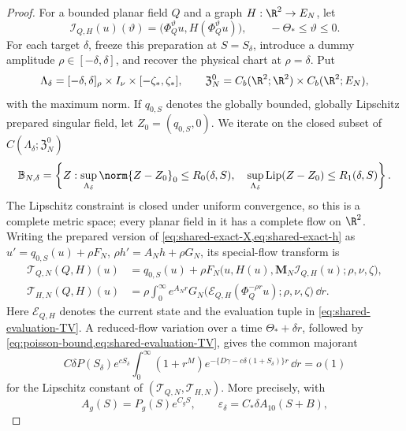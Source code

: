 \begin{proof}
For a bounded planar field \(Q\) and a graph \(H:\R^2\to E_N\), let
\[
 \mathcal I_{Q,H}(u)(\vartheta)
 =\bigl(\Phi_Q^\vartheta u,H(\Phi_Q^\vartheta u)\bigr),
 \qquad -\Theta_*\le\vartheta\le0.
\]
For each target \(\delta\), freeze this preparation at
\(S=S_\delta\), introduce a dummy amplitude
\(\rho\in[-\delta,\delta]\), and recover the physical chart at
\(\rho=\delta\).  Put
\[
 \Lambda_\delta=[-\delta,\delta]_\rho\times I_\nu
                  \times[-\zeta_*,\zeta_*],
 \qquad
 \mathfrak Z_N^0=C_b(\R^2;\R^2)\times C_b(\R^2;E_N),
\]
with the maximum norm.  If \(q_{0,S}\) denotes the globally bounded,
globally Lipschitz prepared singular field, let \(Z_0=(q_{0,S},0)\).  We
iterate on the closed subset of
\(C(\Lambda_\delta;\mathfrak Z_N^0)\)
\begin{equation}
 \mathbb B_{N,\delta}
 =\left\{Z:
 \sup_{\Lambda_\delta}\norm{Z-Z_0}_0\le R_0(\delta,S),\quad
 \sup_{\Lambda_\delta}\operatorname{Lip}(Z-Z_0)\le R_1(\delta,S)
 \right\}.                                            \label{eq:shared-graph-ball}
\end{equation}
The Lipschitz constraint is closed under uniform convergence, so this is a
complete metric space; every planar field in it has a complete flow on
\(\R^2\).  Writing the prepared version of
\cref{eq:shared-exact-X,eq:shared-exact-h} as
\(u'=q_{0,S}(u)+\rho F_N\),
\(\rho h'=A_Nh+\rho G_N\), its special-flow transform is
\begin{align}
 \mathcal T_{Q,N}(Q,H)(u)
 &=q_{0,S}(u)+\rho F_N
   \bigl(u,H(u),\mathbf M_N\mathcal I_{Q,H}(u);\rho,\nu,\zeta\bigr),
                                                               \label{eq:shared-TQ}\\
 \mathcal T_{H,N}(Q,H)(u)
 &=\rho\int_0^\infty e^{A_Nr}G_N
   \bigl(\mathcal E_{Q,H}(\Phi_Q^{-\rho r}u);
               \rho,\nu,\zeta\bigr)\,\dd r.          \label{eq:shared-TH}
\end{align}
Here \(\mathcal E_{Q,H}\) denotes the current state and the evaluation
tuple in \cref{eq:shared-evaluation-TV}.  A reduced-flow variation over a
time \(\Theta_*+\delta r\), followed by
\cref{eq:poisson-bound,eq:shared-evaluation-TV}, gives the common
majorant
\begin{equation}
 C\delta P(S_\delta)e^{cS_\delta}
 \int_0^\infty(1+r^M)
 e^{-\{D\gamma-c\delta(1+S_\delta)\}r}\,\dd r=o(1)   \label{eq:shared-graph-contraction}
\end{equation}
for the Lipschitz constant of \((\mathcal T_{Q,N},\mathcal T_{H,N})\).
More precisely, with
\[
 A_g(S)=P_g(S)e^{C_gS},\qquad
 \varepsilon_\delta=C_*\delta A_{10}(S+B),
\]
\end{proof}
